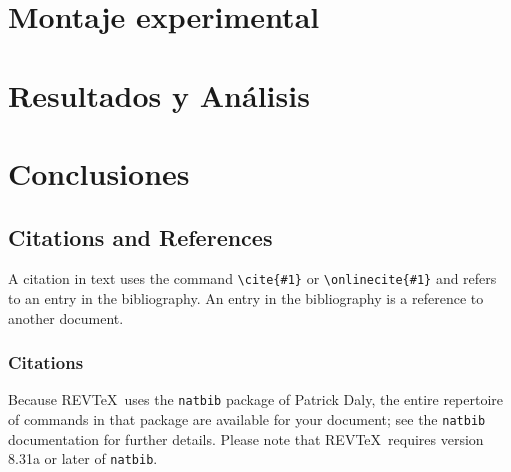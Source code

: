 \documentclass[%
 reprint,
 amsmath,amssymb,
 aps,
]{revtex4-1}
\begin{document}
\section{\label{sec:level1}Montaje experimental}



\section{\label{sec:level1}Resultados y Análisis}



\section{\label{sec:level1}Conclusiones}



\subsection{\label{sec:citeref}Citations and References}
A citation in text uses the command \verb+\cite{#1}+ or
\verb+\onlinecite{#1}+ and refers to an entry in the bibliography. 
An entry in the bibliography is a reference to another document.

\subsubsection{Citations}
Because REV\TeX\ uses the \verb+natbib+ package of Patrick Daly, 
the entire repertoire of commands in that package are available for your document;
see the \verb+natbib+ documentation for further details. Please note that
REV\TeX\ requires version 8.31a or later of \verb+natbib+.
\end{document}
